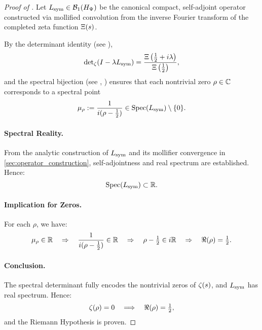 \begin{proof}[Proof of ]
Let \( L_{\mathrm{sym}} \in \mathcal{B}_1(H_{\Psi}) \) be the canonical compact, self-adjoint operator constructed via mollified convolution from the inverse Fourier transform of the completed zeta function \( \Xi(s) \).

By the determinant identity (see ),
\[
\det\nolimits_\zeta(I - \lambda L_{\mathrm{sym}}) = \frac{\Xi\left( \tfrac{1}{2} + i\lambda \right)}{\Xi\left( \tfrac{1}{2} \right)},
\]
and the spectral bijection (see , ) ensures that each nontrivial zero \( \rho \in \mathbb{C} \) corresponds to a spectral point
\[
\mu_\rho := \frac{1}{i(\rho - \tfrac{1}{2})} \in \operatorname{Spec}(L_{\mathrm{sym}}) \setminus \{0\}.
\]

\paragraph{Spectral Reality.}
From the analytic construction of \( L_{\mathrm{sym}} \) and its mollifier convergence in \cref{sec:operator_construction}, self-adjointness and real spectrum are established. Hence:
\[
\operatorname{Spec}(L_{\mathrm{sym}}) \subset \mathbb{R}.
\]

\paragraph{Implication for Zeros.}
For each \( \rho \), we have:
\[
\mu_\rho \in \mathbb{R} \quad \Rightarrow \quad \frac{1}{i(\rho - \tfrac{1}{2})} \in \mathbb{R}
\quad \Rightarrow \quad \rho - \tfrac{1}{2} \in i\mathbb{R}
\quad \Rightarrow \quad \Re(\rho) = \tfrac{1}{2}.
\]

\paragraph{Conclusion.}
The spectral determinant fully encodes the nontrivial zeros of \( \zeta(s) \), and \( L_{\mathrm{sym}} \) has real spectrum. Hence:
\[
\zeta(\rho) = 0 \quad \Longrightarrow \quad \Re(\rho) = \tfrac{1}{2},
\]
and the Riemann Hypothesis is proven.
\end{proof}
